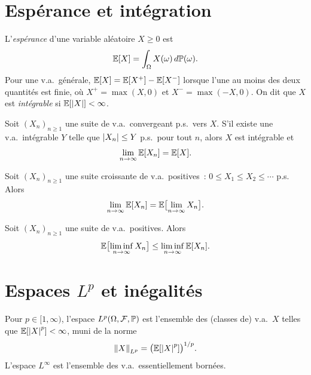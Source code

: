 \section{Esp\'erance et int\'egration}

\begin{definition}
L'\emph{esp\'erance} d'une variable al\'eatoire $X \geq 0$ est
\[
  \mathbb{E}[X] = \int_{\Omega} X(\omega) \, d\mathbb{P}(\omega).
\]
Pour une v.a.\ g\'en\'erale, $\mathbb{E}[X] = \mathbb{E}[X^+] - \mathbb{E}[X^-]$ lorsque l'une au
moins des deux quantit\'es est finie, o\`u $X^+ = \max(X, 0)$ et $X^- = \max(-X, 0)$.
On dit que $X$ est \emph{int\'egrable} si $\mathbb{E}[\left| X \right|] < \infty$.
\end{definition}

\begin{theoreme}
\label{thm:conv_dom}
Soit $(X_n)_{n \geq 1}$ une suite de v.a.\ convergeant p.s.\ vers $X$.
S'il existe une v.a.\ int\'egrable $Y$ telle que $\left| X_n \right| \leq Y$ p.s.\ pour tout $n$,
alors $X$ est int\'egrable et
\[
  \lim_{n \to \infty} \mathbb{E}[X_n] = \mathbb{E}[X].
\]
\end{theoreme}

\begin{theoreme}
\label{thm:conv_mon}
Soit $(X_n)_{n \geq 1}$ une suite croissante de v.a.\ positives~:
$0 \leq X_1 \leq X_2 \leq \cdots$ p.s. Alors
\[
  \lim_{n \to \infty} \mathbb{E}[X_n] = \mathbb{E}\bigl[\lim_{n \to \infty} X_n\bigr].
\]
\end{theoreme}

\begin{theoreme}
Soit $(X_n)_{n \geq 1}$ une suite de v.a.\ positives. Alors
\[
  \mathbb{E}\bigl[\liminf_{n \to \infty} X_n\bigr] \leq \liminf_{n \to \infty} \mathbb{E}[X_n].
\]
\end{theoreme}

\section{Espaces $L^p$ et in\'egalit\'es}

\begin{definition}[Espace $L^p$]
Pour $p \in [1, \infty)$, l'espace $L^p(\Omega, \mathcal{F}, \mathbb{P})$ est l'ensemble
des (classes de) v.a.\ $X$ telles que $\mathbb{E}[\left| X \right|^p] < \infty$, muni de la norme
\[
  \left\| X \right\|_{L^p} = \bigl(\mathbb{E}[\left| X \right|^p]\bigr)^{1/p}.
\]
L'espace $L^{\infty}$ est l'ensemble des v.a.\ essentiellement born\'ees.
\end{definition}

